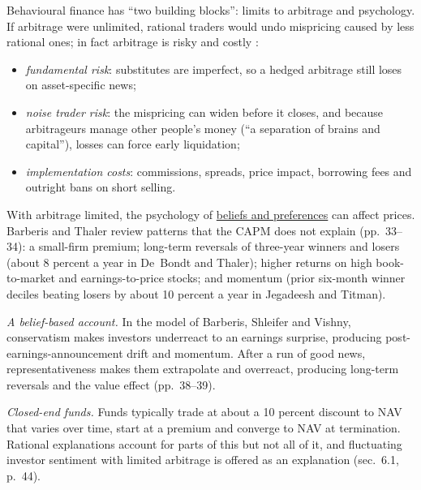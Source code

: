 \begin{qfmechanism}\label{mech:biases-market-anomalies}
 Behavioural finance has ``two building blocks'': limits to arbitrage and psychology. If arbitrage were unlimited, rational traders would undo mispricing caused by less rational ones; in fact arbitrage is risky and costly \citep[NBER working paper 9222 version, abstract and secs.~2.1--2.2, pp.~3--6]{wide-barberis-thaler-survey}:
\begin{itemize}
\item \emph{fundamental risk}: substitutes are imperfect, so a hedged arbitrage still loses on asset-specific news;
\item \emph{noise trader risk}: the mispricing can widen before it closes, and because arbitrageurs manage other people's money (``a separation of brains and capital''), losses can force early liquidation;
\item \emph{implementation costs}: commissions, spreads, price impact, borrowing fees and outright bans on short selling.
\end{itemize}
With arbitrage limited, the psychology of \hyperref[def:behavioural-biases]{beliefs and preferences} can affect prices. Barberis and Thaler review patterns that the CAPM does not explain (pp.~33--34): a small-firm premium; long-term reversals of three-year winners and losers (about 8 percent a year in De~Bondt and Thaler); higher returns on high book-to-market and earnings-to-price stocks; and momentum (prior six-month winner deciles beating losers by about 10 percent a year in Jegadeesh and Titman).

\emph{A belief-based account.} In the model of Barberis, Shleifer and Vishny, conservatism makes investors underreact to an earnings surprise, producing post-earnings-announcement drift and momentum. After a run of good news, representativeness makes them extrapolate and overreact, producing long-term reversals and the value effect (pp.~38--39).

\emph{Closed-end funds.} Funds typically trade at about a 10 percent discount to NAV that varies over time, start at a premium and converge to NAV at termination. Rational explanations account for parts of this but not all of it, and fluctuating investor sentiment with limited arbitrage is offered as an explanation (sec.~6.1, p.~44).


\end{qfmechanism}
